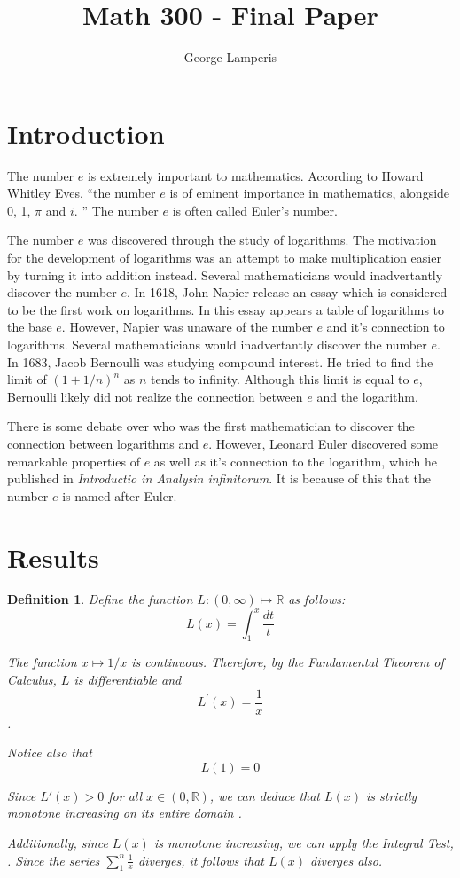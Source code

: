 \documentclass[12pt]{article}
\title{Math 300 - Final Paper}
\author{George Lamperis}
\date{}
\theoremstyle{mystyle}
\newtheorem{defn}[thm]{Definition}
\newcommand{\R}{\mathbb{R}}
\begin{document}
\maketitle

\section{Introduction}
The number $e$ is extremely important to mathematics. According to Howard
Whitley Eves, ``the number $e$ is of eminent importance in mathematics,
alongside 0, 1, $\pi$ and $i$. \cite{wikipedia} '' The number $e$ is often
called Euler's number.

The number $e$ was discovered through the study of logarithms. The motivation
for the development of logarithms was an attempt to make multiplication easier
by turning it into addition instead. Several mathematicians would inadvertantly
discover the number $e$. In 1618, John Napier release an essay which is
considered to be the first work on logarithms. In this essay appears a table of 
logarithms to the base $e$. However, Napier was unaware of the number $e$
and it's connection to logarithms.  Several mathematicians would inadvertantly
discover the number $e$. In 1683, Jacob Bernoulli was studying compound interest. 
He tried to find the limit of $(1 + 1/n)^n$ as $n$ tends to infinity. Although
this limit is equal to $e$, Bernoulli likely did not realize the connection
between $e$ and the logarithm. \cite{USAS}

There is some debate over who was the first mathematician to discover the
connection between logarithms and $e$. However, Leonard Euler discovered some
remarkable properties of $e$ as well as it's connection to the logarithm, which
he published in \textit{Introductio in Analysin infinitorum}. It is because of
this that the number $e$ is named after Euler.


\section{Results}

\begin{defn}
  Define the function $L: (0, \infty) \mapsto \R$ as follows:
  $$ L(x) = \int_1^x \frac{dt}{t} $$
  
  The function $x \mapsto 1/x$ is continuous. Therefore, by the Fundamental
  Theorem of Calculus, $L$ is differentiable and
  $$ L^\prime(x) = \frac{1}{x} $$.
  
  Notice also that
  $$L(1) = 0$$
  
  Since $L'(x) > 0$ for all $x \in (0, \R)$,  we can deduce that $L(x)$ is
  strictly monotone increasing on its entire domain \cite[Theorem 4.13]{howie}.
  
  Additionally, since $L(x)$ is monotone increasing, we can apply the Integral
  Test, \cite[Theorem 5.37]{howie}. Since the series $\sum_1^n \frac{1}{x}$
  diverges, it follows that $L(x)$ diverges also.
\end{defn}
\end{document}
